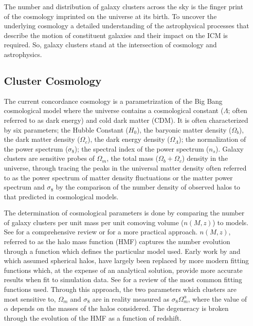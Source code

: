 \documentclass[12pt]{article}
\begin{document}
The number and distribution of galaxy clusters across the sky is the finger print of the cosmology imprinted on the universe at its birth. To uncover the underlying cosmology a detailed understanding of the astrophysical processes that describe the motion of constituent galaxies and their impact on the ICM is required. So, galaxy clusters stand at the intersection of cosmology and astrophysics. 

\subsection{Cluster Cosmology}
The current concordance cosmology is a parametrization of the Big Bang cosmological model where the universe contains a cosmological constant ($\Lambda$; often referred to as dark energy) and cold dark matter (CDM). It is often characterized by six parameters; the Hubble Constant ($H_0$), the baryonic matter density ($\Omega_b$), the dark matter density ($\Omega_c$), the dark energy density ($\Omega_\Lambda$); the normalization of the power spectrum ($\sigma_8$); the spectral index of the power spectrum ($n_s$). Galaxy clusters are sensitive probes of $\Omega_m$, the total mass ($\Omega_b + \Omega_c$) density in the universe, through tracing the peaks in the universal matter density often referred to as the power spectrum of matter density fluctuations or the matter power spectrum and $\sigma_8$ by the comparison of the number density of observed halos to that predicted in cosmological models. %

The determination of cosmological parameters is done by comparing the number of galaxy clusters per unit mass per unit comoving volume ($n(M,z)$) to models. See \cite{Allen2011} for a comprehensive review or \cite{Murray2013} for a more practical approach. $n(M,z)$, referred to as the halo mass function (HMF) captures the number evolution through a function which defines the particular model used. Early work by \cite{Press1974} and \cite{Bond1991} which assumed spherical halos, have largely been replaced by more modern fitting functions which, at the expense of an analytical solution, provide more accurate results when fit to simulation data. See \cite{Murray2013} for a review of the most common fitting functions used. Through this approach, the two parameters which clusters are most sensitive to, $\Omega_m$ and $\sigma_8$ are in reality measured as $\sigma_8\Omega_m^\alpha$, where the value of $\alpha$ depends on the masses of the halos considered. The degeneracy is broken through the evolution of the HMF as a function of redshift. 
\end{document}
